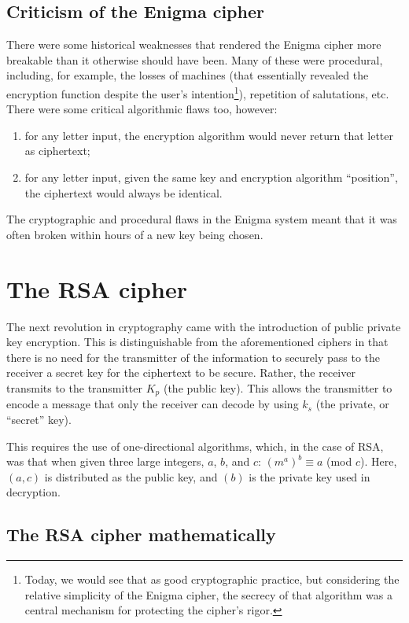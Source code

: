 \documentclass{AIAA}
\begin{document}
\subsection{Criticism of the Enigma cipher}

There were some historical weaknesses that rendered the Enigma cipher more breakable than it otherwise should have been. Many of these were procedural, including, for example, the losses of machines (that essentially revealed the encryption function despite the user's intention\footnote{Today, we would see that as good cryptographic practice, but considering the relative simplicity of the Enigma cipher, the secrecy of that algorithm was a central mechanism for protecting the cipher's rigor.}), repetition of salutations, etc. There were some critical algorithmic flaws too, however:  
\begin{enumerate}
\item for any letter input, the encryption algorithm would never return that letter as ciphertext;
\item for any letter input, given the same key and encryption algorithm ``position'', the ciphertext would always be identical. 
\end{enumerate}
The cryptographic and procedural flaws in the Enigma system meant that it was often broken within hours of a new key being chosen.

\section{The RSA cipher}

The next revolution in cryptography came with the introduction of public private key encryption. This is distinguishable from the aforementioned ciphers in that there is no need for the transmitter of the information to securely pass to the receiver a secret key for the ciphertext to be secure. Rather, the receiver transmits to the transmitter $K_{p}$ (the public key). This allows the transmitter to encode a message that only the receiver can decode by using $k_{s}$ (the private, or ``secret'' key).

This requires the use of one-directional algorithms, which, in the case of RSA, was that when given three large integers, $a$, $b$, and $c$: $(m^{a})^{b} \equiv a $ (mod $c$). Here, $(a,c)$ is distributed as the public key, and $(b)$ is the private key used in decryption.

\subsection{The RSA cipher mathematically}
\end{document}
